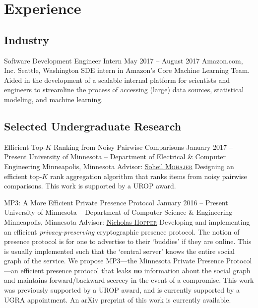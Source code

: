 \section{Experience}
\subsection{Industry}
\block
  {Software Development Engineer Intern}
  {May 2017 -- August 2017}
  {Amazon.com, Inc.}
  {Seattle, Washington}
  {}
  {
    SDE intern in Amazon's Core Machine Learning Team. Aided in the development
    of a scalable internal platform for scientists and engineers to streamline
    the process of accessing (large) data sources, statistical modeling, and
    machine learning.
  }

\subsection{Selected Undergraduate Research}
\block
  {Efficient Top-\boldmath$K$ Ranking from Noisy Pairwise Comparisons}
  {January 2017 -- Present}
  {University of Minnesota -- Department of Electrical \& Computer Engineering}
  {Minneapolis, Minnesota}
  {Advisor: \href{\soheil}{Soheil \textsc{Mohajer}}}
  {
    Designing an efficient top-$K$ rank aggregation algorithm that ranks items
    from noisy pairwise comparisons.  This work is supported by a UROP award.
  }

\block
  {MP3: A More Efficient Private Presence Protocol}
  {January 2016 -- Present}
  {University of Minnesota -- Department of Computer Science \& Engineering}
  {Minneapolis, Minnesota}
  {Advisor: \href{\hoppernj}{Nicholas \textsc{Hopper}}}
  {
    Developing and implementing an efficient \emph{privacy-preserving}
    cryptographic presence protocol. The notion of presence protocol is for one
    to advertise to their `buddies' if they are online. This is usually
    implemented such that the `central server' knows the entire social graph of
    the service. We propose MP3---the Minnesota Private Presence Protocol---an
    efficient presence protocol that leaks \textbf{no} information about the
    social graph and maintains forward/backward secrecy in the event of a
    compromise.  This work was previously supported by a UROP award, and is
    currently supported by a UGRA appointment. An arXiv preprint of this work is
    currently available.
  }

